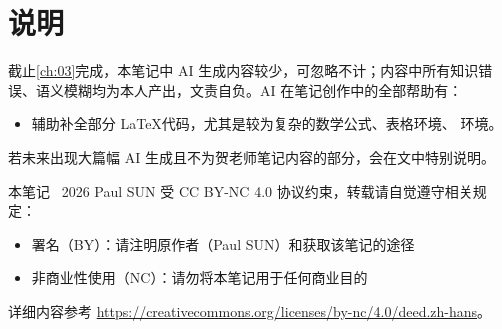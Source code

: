 \cleardoublepage
\pagestyle{symplain}
\thispagestyle{symplain}

\chapter*{说\hspace{1em}明}
\vspace{\baselineskip}


截止\ref{ch:03}完成，本笔记中 AI 生成内容较少，可忽略不计；内容中所有知识错误、语义模糊均为本人产出，文责自负。AI 在笔记创作中的全部帮助有：
\begin{itemize}
    \item 辅助补全部分 \LaTeX 代码，尤其是较为复杂的数学公式、表格环境、 环境。
\end{itemize}
若未来出现大篇幅 AI 生成且不为贺老师笔记内容的部分，会在文中特别说明。

\myskip
{}

本笔记 \textcopyright\ 2026 Paul SUN 受 CC BY-NC 4.0 协议约束，转载请自觉遵守相关规定：
\begin{itemize}
    \item 署名（BY）：请注明原作者（Paul SUN）和获取该笔记的途径
    \item 非商业性使用（NC）：请勿将本笔记用于任何商业目的
\end{itemize}
详细内容参考 \url{https://creativecommons.org/licenses/by-nc/4.0/deed.zh-hans}。

\clearpage
\pagestyle{symplain}
